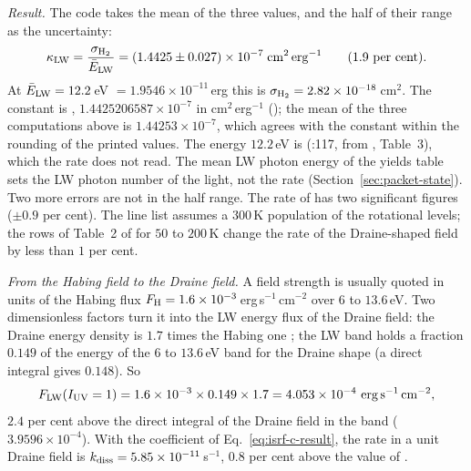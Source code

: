 \emph{Result.} The code takes the mean of the three values, and the half of their
range as the uncertainty:
\begin{equation}
  \kappa_{\rm LW}=\frac{\sigma_{\rm H_2}}{\bar E_{\rm LW}}
  =(1.4425\pm0.027)\times10^{-7}\;{\rm cm^2\,erg^{-1}}
  \qquad(1.9\ {\rm per\ cent}).
  \label{eq:isrf-c-result}
\end{equation}
At $\bar E_{\rm LW}=12.2$\,eV $=1.9546\times10^{-11}$\,erg this is
$\sigma_{\rm H_2}=2.82\times10^{-18}$\,cm$^2$. The constant is
, $1.4425206587\times10^{-7}$ in
cm$^2$\,erg$^{-1}$ (); the mean of the
three computations above is $1.44253\times10^{-7}$, which agrees with the
constant within the rounding of the printed values. The energy $12.2$\,eV is
 (:117, from \citealt{Kim2023},
Table~3), which the rate does not read. The mean LW photon energy of the
yields table sets the LW photon number of the light, not the rate
(Section~\ref{sec:packet-state}). Two more
errors are not in the half range. The rate of \citet{Sternberg2014} has two
significant figures ($\pm0.9$ per cent). The line list assumes a $300$\,K
population of the rotational levels; the rows of Table~2 of
\citet{DraineBertoldi1996} for $50$ to $200$\,K change the rate of the
Draine-shaped field by less than $1$ per cent.

\emph{From the Habing field to the Draine field.} A field strength is
usually quoted in units of the Habing flux $F_{\rm H}=1.6\times10^{-3}$\,erg\,s$^{-1}$\,cm$^{-2}$
over $6$ to $13.6$\,eV. Two dimensionless factors turn it into the LW energy flux of the
Draine field: the Draine energy density is $1.7$ times
the Habing one \citep{Sternberg2014}; the LW band holds a fraction $0.149$ of
the energy of the $6$ to $13.6$\,eV band for the Draine shape (a direct
integral gives $0.148$). So
\begin{equation}
  F_{\rm LW}(I_{\rm UV}=1)=1.6\times10^{-3}\times0.149\times1.7
  =4.053\times10^{-4}\ {\rm erg\,s^{-1}\,cm^{-2}},
\end{equation}
$2.4$ per cent above the direct integral of the Draine field in the band
($3.9596\times10^{-4}$). With the coefficient of Eq.~\eqref{eq:isrf-c-result},
the rate in a unit Draine field is $k_{\rm diss}=5.85\times10^{-11}$\,s$^{-1}$,
$0.8$ per cent above the value of \citet{Sternberg2014}.


